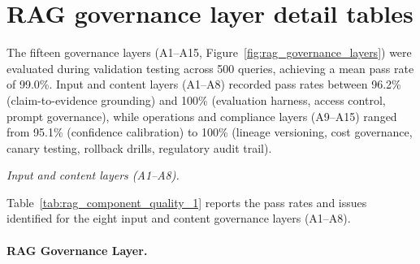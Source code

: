 \section{RAG governance layer detail tables}
\label{sec:appendix_ch4_s8}

The fifteen governance layers (A1--A15, Figure~\ref{fig:rag_governance_layers}) were evaluated during validation testing across 500 queries, achieving a mean pass rate of 99.0\%. Input and content layers (A1--A8) recorded pass rates between 96.2\% (claim-to-evidence grounding) and 100\% (evaluation harness, access control, prompt governance), while operations and compliance layers (A9--A15) ranged from 95.1\% (confidence calibration) to 100\% (lineage versioning, cost governance, canary testing, rollback drills, regulatory audit trail).

\noindent\textit{Input and content layers (A1--A8).}

Table~\ref{tab:rag_component_quality_1} reports the pass rates and issues identified for the eight input and content governance layers (A1--A8).

\paragraph{RAG Governance Layer.}


